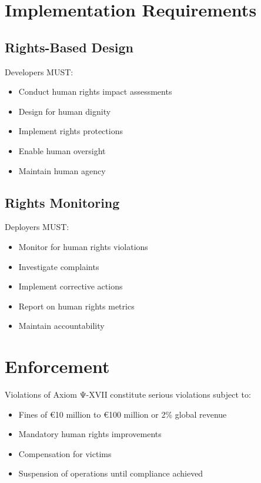 \vspace{0.5cm}

\section{Implementation Requirements}

\subsection{Rights-Based Design}

Developers MUST:

\begin{itemize}
    \item Conduct human rights impact assessments
    \item Design for human dignity
    \item Implement rights protections
    \item Enable human oversight
    \item Maintain human agency
\end{itemize}

\subsection{Rights Monitoring}

Deployers MUST:

\begin{itemize}
    \item Monitor for human rights violations
    \item Investigate complaints
    \item Implement corrective actions
    \item Report on human rights metrics
    \item Maintain accountability
\end{itemize}

\vspace{0.5cm}

\section{Enforcement}

Violations of Axiom Ψ-XVII constitute serious violations subject to:

\begin{itemize}
    \item Fines of €10 million to €100 million or 2\% global revenue
    \item Mandatory human rights improvements
    \item Compensation for victims
    \item Suspension of operations until compliance achieved
\end{itemize}

